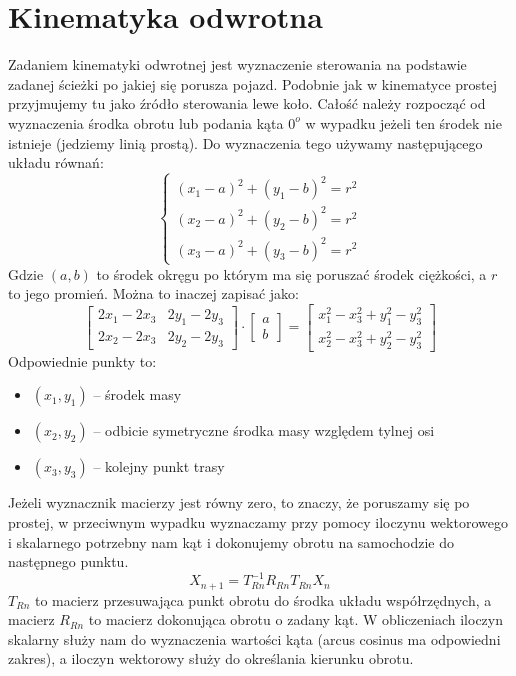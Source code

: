 \documentclass[a4paper, 12pt]{report}
\begin{document}
		\section{Kinematyka odwrotna}
			Zadaniem kinematyki odwrotnej jest wyznaczenie sterowania na podstawie zadanej ścieżki po jakiej się porusza pojazd. Podobnie jak w kinematyce prostej przyjmujemy tu jako źródło sterowania lewe koło.
			\newline
			\newline
			Całość należy rozpocząć od wyznaczenia środka obrotu lub podania kąta $0^o$ w wypadku jeżeli ten środek nie istnieje (jedziemy linią prostą). Do wyznaczenia tego używamy następującego układu równań:
			$$
				\left\{\begin{matrix}
					(x_1-a)^2 + (y_1-b)^2 = r^2 \\ 
					(x_2-a)^2 + (y_2-b)^2 = r^2 \\ 
					(x_3-a)^2 + (y_3-b)^2 = r^2
				\end{matrix}\right.
			$$
			Gdzie $(a,b)$ to środek okręgu po którym ma się poruszać środek ciężkości, a $r$ to jego promień. Można to inaczej zapisać jako:
			$$
				\begin{bmatrix}
					2x_1-2x_3 & 2y_1-2y_3\\ 
					2x_2-2x_3 & 2y_2-2y_3 
				\end{bmatrix}
				\cdot
				\begin{bmatrix}
					a\\ 
					b
				\end{bmatrix}
				=
				\begin{bmatrix}
					x_1^2 - x_3^2 + y_1^2-y_3^2\\
					x_2^2 - x_3^2 + y_2^2-y_3^2 
				\end{bmatrix}
			$$
			Odpowiednie punkty to:
			\begin{itemize}
				\item[] $(x_1,y_1)$ -- środek masy
				\item[] $(x_2,y_2)$ -- odbicie symetryczne środka masy względem tylnej osi
				\item[] $(x_3,y_3)$ -- kolejny punkt trasy
			\end{itemize}
			Jeżeli wyznacznik macierzy jest równy zero, to znaczy, że poruszamy się po prostej, w przeciwnym wypadku wyznaczamy przy pomocy iloczynu wektorowego i skalarnego potrzebny nam kąt i dokonujemy obrotu na samochodzie do następnego punktu.
			$$
				X_{n+1} = T_{Rn}^{-1}R_{Rn}T_{Rn} X_{n}
			$$
			$T_{Rn}$ to macierz przesuwająca punkt obrotu do środka układu współrzędnych, a macierz $R_{Rn}$ to macierz dokonująca obrotu o zadany kąt. W obliczeniach iloczyn skalarny służy nam do wyznaczenia wartości kąta (arcus cosinus ma odpowiedni zakres), a iloczyn wektorowy służy do określania kierunku obrotu.
\end{document}
